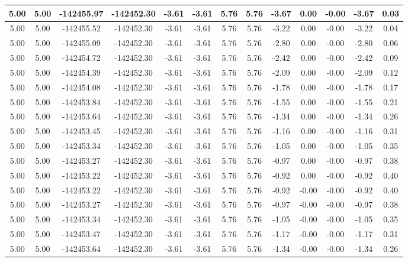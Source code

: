 \begin{table}[htbp]
\begin{adjustbox}{angle=90}
\begin{tabular}{|c|c|c|c|c|c|c|c|c|c|c|c|c|}
 5.00 & 5.00 & -142455.97 & -142452.30 & -3.61 & -3.61 & 5.76 & 5.76 & -3.67 & 0.00 & -0.00 & -3.67 & 0.03\\ \hline
 5.00 & 5.00 & -142455.52 & -142452.30 & -3.61 & -3.61 & 5.76 & 5.76 & -3.22 & 0.00 & -0.00 & -3.22 & 0.04\\ \hline
 5.00 & 5.00 & -142455.09 & -142452.30 & -3.61 & -3.61 & 5.76 & 5.76 & -2.80 & 0.00 & -0.00 & -2.80 & 0.06\\ \hline
 5.00 & 5.00 & -142454.72 & -142452.30 & -3.61 & -3.61 & 5.76 & 5.76 & -2.42 & 0.00 & -0.00 & -2.42 & 0.09\\ \hline
 5.00 & 5.00 & -142454.39 & -142452.30 & -3.61 & -3.61 & 5.76 & 5.76 & -2.09 & 0.00 & -0.00 & -2.09 & 0.12\\ \hline
 5.00 & 5.00 & -142454.08 & -142452.30 & -3.61 & -3.61 & 5.76 & 5.76 & -1.78 & 0.00 & -0.00 & -1.78 & 0.17\\ \hline
 5.00 & 5.00 & -142453.84 & -142452.30 & -3.61 & -3.61 & 5.76 & 5.76 & -1.55 & 0.00 & -0.00 & -1.55 & 0.21\\ \hline
 5.00 & 5.00 & -142453.64 & -142452.30 & -3.61 & -3.61 & 5.76 & 5.76 & -1.34 & 0.00 & -0.00 & -1.34 & 0.26\\ \hline
 5.00 & 5.00 & -142453.45 & -142452.30 & -3.61 & -3.61 & 5.76 & 5.76 & -1.16 & 0.00 & -0.00 & -1.16 & 0.31\\ \hline
 5.00 & 5.00 & -142453.34 & -142452.30 & -3.61 & -3.61 & 5.76 & 5.76 & -1.05 & 0.00 & -0.00 & -1.05 & 0.35\\ \hline
 5.00 & 5.00 & -142453.27 & -142452.30 & -3.61 & -3.61 & 5.76 & 5.76 & -0.97 & 0.00 & -0.00 & -0.97 & 0.38\\ \hline
 5.00 & 5.00 & -142453.22 & -142452.30 & -3.61 & -3.61 & 5.76 & 5.76 & -0.92 & 0.00 & -0.00 & -0.92 & 0.40\\ \hline
 5.00 & 5.00 & -142453.22 & -142452.30 & -3.61 & -3.61 & 5.76 & 5.76 & -0.92 & -0.00 & -0.00 & -0.92 & 0.40\\ \hline
 5.00 & 5.00 & -142453.27 & -142452.30 & -3.61 & -3.61 & 5.76 & 5.76 & -0.97 & -0.00 & -0.00 & -0.97 & 0.38\\ \hline
 5.00 & 5.00 & -142453.34 & -142452.30 & -3.61 & -3.61 & 5.76 & 5.76 & -1.05 & -0.00 & -0.00 & -1.05 & 0.35\\ \hline
 5.00 & 5.00 & -142453.47 & -142452.30 & -3.61 & -3.61 & 5.76 & 5.76 & -1.17 & -0.00 & -0.00 & -1.17 & 0.31\\ \hline
 5.00 & 5.00 & -142453.64 & -142452.30 & -3.61 & -3.61 & 5.76 & 5.76 & -1.34 & -0.00 & -0.00 & -1.34 & 0.26\\ \hline

\end{tabular}
\end{adjustbox}
\end{table}
